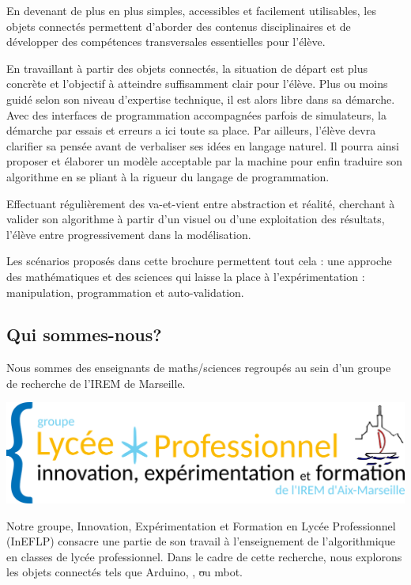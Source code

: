 En devenant de plus en plus simples, accessibles et facilement utilisables, les objets connectés permettent d'aborder des contenus disciplinaires et de développer des compétences transversales essentielles pour l'élève.

En travaillant à partir des objets connectés, la situation de départ est plus concrète et l'objectif à atteindre suffisamment clair pour l'élève. Plus ou moins guidé selon son niveau d'expertise technique, il est alors libre dans sa démarche.
Avec des interfaces de programmation accompagnées parfois de simulateurs, la démarche par essais et erreurs a ici toute sa place.
Par ailleurs, l'élève devra clarifier sa pensée avant de verbaliser ses idées en langage naturel. Il pourra ainsi proposer et élaborer un modèle acceptable par la machine pour enfin traduire son algorithme en se pliant à la rigueur du langage de programmation. 

Effectuant régulièrement des va-et-vient entre abstraction et réalité, cherchant à valider son algorithme à partir d'un visuel ou d'une exploitation des résultats, l'élève entre progressivement dans la modélisation.

Les scénarios proposés dans cette brochure permettent tout cela : une approche des mathématiques et des sciences qui laisse la place à l'expérimentation : manipulation, programmation et auto-validation. 




\pagebreak

\subsection{Qui sommes-nous?}

Nous sommes des enseignants de maths/sciences regroupés au sein d’un groupe de recherche de l'IREM de Marseille.

\begin{center}
	\href{http://url.univ-irem.fr/ineflp}
	{\includegraphics[width=0.5\linewidth]{res/fig-logo-ineflp.png}}
\end{center}

Notre groupe, Innovation, Expérimentation et Formation en Lycée Professionnel (InEFLP) consacre une partie de son travail à l’enseignement de l’algorithmique en classes de lycée professionnel. Dans le cadre de cette recherche, nous explorons les objets connectés tels que Arduino, \mb, \st ou mbot.





